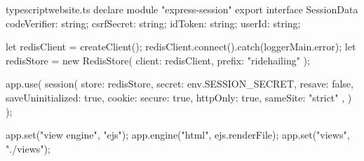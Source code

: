 \documentclass[../thesis.tex]{subfiles}
\begin{document}
\begin{codeblock}{typescript}{website.ts}
  declare module "express-session" {
    export interface SessionData {
      codeVerifier: string;
      csrfSecret: string;
      idToken: string;
      userId: string;
    }
  }

  let redisClient = createClient();
  redisClient.connect().catch(loggerMain.error);
  let redisStore = new RedisStore({ client: redisClient, prefix: "ridehailing" });

  app.use(
    session({
      store: redisStore,
      secret: env.SESSION_SECRET,
      resave: false,
      saveUninitialized: true,
      cookie: { secure: true, httpOnly: true, sameSite: "strict" },
    })
  );

  app.set("view engine", "ejs");
  app.engine("html", ejs.renderFile);
  app.set("views", "./views");
\end{codeblock}
\end{document}
